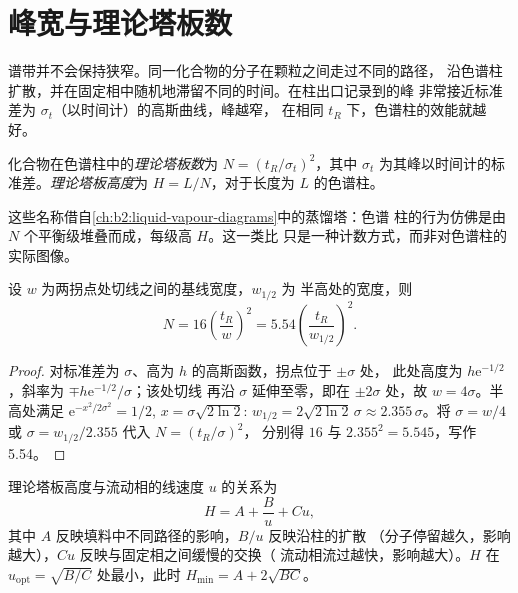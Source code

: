 \section{峰宽与理论塔板数}

谱带并不会保持狭窄。同一化合物的分子在颗粒之间走过不同的路径，
沿色谱柱扩散，并在固定相中随机地滞留不同的时间。在柱出口记录到的峰
非常接近标准差为 $\sigma_t$（以时间计）的高斯曲线，峰越窄，
在相同 $t_R$ 下，色谱柱的效能就越好。

\begin{definition}[理论塔板数]\label{def:b2:chromatography:plates}
化合物在色谱柱中的\emph{理论塔板数}为 $N = (t_R/\sigma_t)^2$，其中
$\sigma_t$ 为其峰以时间计的标准差。\emph{理论塔板高度}为
$H = L/N$，对于长度为 $L$ 的色谱柱。
\end{definition}

这些名称借自\cref{ch:b2:liquid-vapour-diagrams}中的蒸馏塔：色谱
柱的行为仿佛是由 $N$ 个平衡级堆叠而成，每级高 $H$。这一类比
只是一种计数方式，而非对色谱柱的实际图像。

\begin{proposition}[由峰求理论塔板数]\label{prop:b2:chromatography:plate-number}
设 $w$ 为两拐点处切线之间的基线宽度，$w_{1/2}$ 为
半高处的宽度，则
\begin{equation*}
N = 16\left(\frac{t_R}{w}\right)^2 = 5.54\left(\frac{t_R}{w_{1/2}}\right)^2.
\end{equation*}
\end{proposition}

\begin{proof}
对标准差为 $\sigma$、高为 $h$ 的高斯函数，拐点位于 $\pm\sigma$ 处，
此处高度为 $h\mathrm e^{-1/2}$，斜率为 $\mp h\mathrm e^{-1/2}/\sigma$；该处切线
再沿 $\sigma$ 延伸至零，即在 $\pm2\sigma$ 处，故 $w = 4\sigma$。半高处满足
$\mathrm e^{-x^2/2\sigma^2} = 1/2$, $x = \sigma\sqrt{2\ln2}$: $w_{1/2} = 2\sqrt{2\ln2}\,\sigma \approx
2.355\,\sigma$。将 $\sigma = w/4$ 或 $\sigma = w_{1/2}/2.355$ 代入 $N = (t_R/\sigma)^2$，
分别得 $16$ 与 $2.355^2 = 5.545$，写作 5.54。
\end{proof}

\begin{proposition}[范第姆特方程]\label{prop:b2:chromatography:van-deemter}
理论塔板高度与流动相的线速度 $u$ 的关系为
\begin{equation*}
H = A + \frac{B}{u} + Cu,
\end{equation*}
其中 $A$ 反映填料中不同路径的影响，$B/u$ 反映沿柱的扩散
（分子停留越久，影响越大），$Cu$ 反映与固定相之间缓慢的交换（
流动相流过越快，影响越大）。$H$ 在 $u_{\mathrm{opt}} = \sqrt{B/C}$ 处最小，此时 $H_{\min} =
A + 2\sqrt{BC}$。
\end{proposition}

